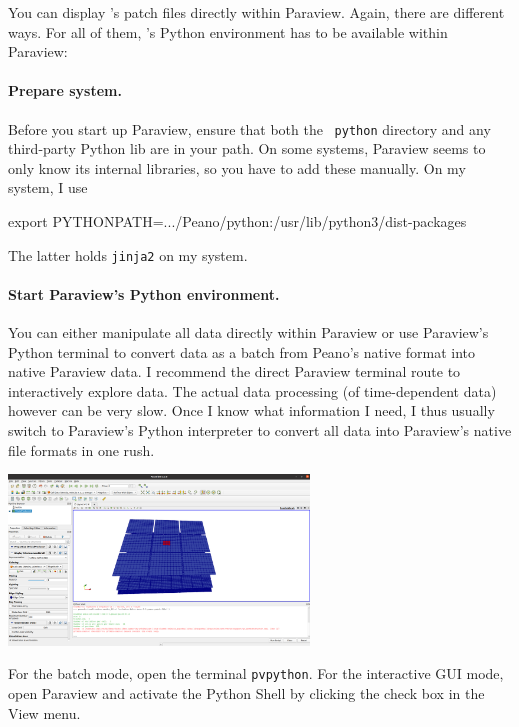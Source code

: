 \noindent
You can display \Peano's patch files directly within Paraview. 
Again, there are different ways.
For all of them, \Peano's Python environment has to be available within Paraview:



\paragraph{Prepare system.}
%
%
Before you start up Paraview, ensure that both the \Peano\ \texttt{python}
directory and any third-party Python lib are in your path. 
On some systems, Paraview seems to
only know its internal libraries, so you have to add these manually. On my
system, I use
  \begin{code}
export PYTHONPATH=.../Peano/python:/usr/lib/python3/dist-packages  
  \end{code}
The latter holds \texttt{jinja2} on my system.


\paragraph{Start Paraview's Python environment.}
%
%
You can either manipulate all data directly within Paraview or use Paraview's Python 
terminal to convert data as a batch from Peano's native format into native Paraview data.
I recommend the direct Paraview terminal route to interactively explore data.
The actual data processing (of time-dependent data) however can be very slow.
Once I know what information I need, I thus usually switch to Paraview's Python interpreter 
to convert all data into Paraview's native file formats in one rush.


\begin{center}
 \includegraphics[width=0.6\textwidth]{80_postprocessing/paraview.png}
\end{center}


For the batch mode, open the terminal \texttt{pvpython}.
For the interactive GUI mode, open Paraview and activate the Python Shell by clicking the check box in
the View menu.


